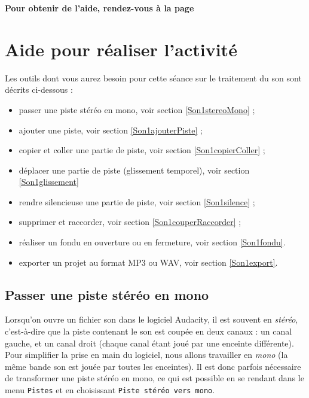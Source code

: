 \textbf{Pour obtenir de l'aide, rendez-vous à la page \pageref{Son5eOutils}}

\vfill



\vfill

\phantom{rien} 

\newpage


\section{Aide pour réaliser l'activité}\label{Son5eOutils}

Les outils dont vous aurez besoin pour cette séance sur le traitement du son sont décrits ci-dessous :

\begin{itemize}   
\item passer une piste stéréo en mono, voir section \vref{Son1stereoMono} ;
\item ajouter une piste, voir section \vref{Son1ajouterPiste} ;
\item copier et coller une partie de piste, voir section \vref{Son1copierColler} ;
\item déplacer une partie de piste (glissement temporel), voir section \vref{Son1glissement}
\item rendre silencieuse une partie de piste, voir section \vref{Son1silence} ;
\item supprimer et raccorder, voir section \vref{Son1couperRaccorder} ;
\item réaliser un fondu en ouverture ou en fermeture, voir section \vref{Son1fondu}.
\item exporter un projet au format MP3 ou WAV, voir section \vref{Son1export}.
\end{itemize} 



\subsection{Passer une piste stéréo en mono}\label{Son1stereoMono} 

Lorsqu'on ouvre un fichier son dans le logiciel Audacity, il est souvent en \emph{stéréo}, c'est-à-dire que la piste contenant le son est coupée en deux canaux : un canal gauche, et un canal droit (chaque canal étant joué par une enceinte différente). Pour simplifier la prise en main du logiciel, nous allons travailler en \emph{mono} (la même bande son est jouée par toutes les enceintes). Il est donc parfois nécessaire de transformer une piste stéréo en mono, ce qui est possible en se rendant dans le menu \texttt{Pistes} et en choisissant \texttt{Piste stéréo vers mono}.    


